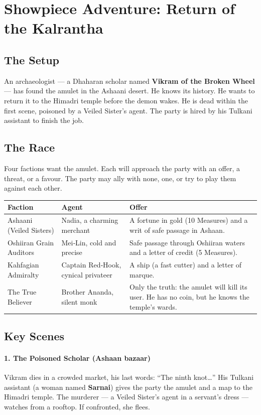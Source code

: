 \documentclass[11pt]{book}
\begin{document}
\section{Showpiece Adventure: Return of the Kalrantha}

\subsection{The Setup}
An archaeologist — a Dhaharan scholar named \textbf{Vikram of the Broken Wheel} — has found the amulet in the Ashaani desert. He knows its history. He wants to return it to the Himadri temple before the demon wakes. He is dead within the first scene, poisoned by a Veiled Sister’s agent. The party is hired by his Tulkani assistant to finish the job.

\subsection{The Race}
Four factions want the amulet. Each will approach the party with an offer, a threat, or a favour. The party may ally with none, one, or try to play them against each other.

\begin{longtable}{|p{}|p{}|p{}|}
\hline
\textbf{Faction} & \textbf{Agent} & \textbf{Offer} \\
\hline
Ashaani (Veiled Sisters) & Nadia, a charming merchant & A fortune in gold (10 Measures) and a writ of safe passage in Ashaan. \\
\hline
Oshiiran Grain Auditors & Mei‑Lin, cold and precise & Safe passage through Oshiiran waters and a letter of credit (5 Measures). \\
\hline
Kahfagian Admiralty & Captain Red‑Hook, cynical privateer & A ship (a fast cutter) and a letter of marque. \\
\hline
The True Believer & Brother Ananda, silent monk & Only the truth: the amulet will kill its user. He has no coin, but he knows the temple’s wards. \\
\hline
\end{longtable}

\subsection{Key Scenes}

\paragraph{1. The Poisoned Scholar (Ashaan bazaar)}
Vikram dies in a crowded market, his last words: “The ninth knot…” His Tulkani assistant (a woman named \textbf{Sarnai}) gives the party the amulet and a map to the Himadri temple. The murderer — a Veiled Sister’s agent in a servant’s dress — watches from a rooftop. If confronted, she flees.
\end{document}
